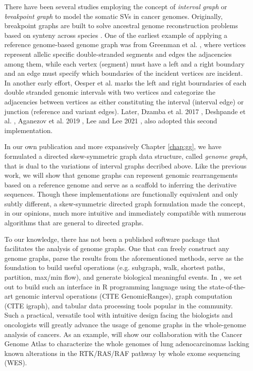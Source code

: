 \documentclass[phd,tocprelim]{cornell}
\begin{document}
There have been several studies employing the concept of \textit{interval graph} or \textit{breakpoint graph} to model the somatic SVs in cancer genomes. Originally, breakpoint graphs are built to solve ancestral genome reconstruction problems based on synteny across species \cite{Alekseyev2009-fw,Avdeyev2016-un}. One of the earliest example of applying a reference genome-based genome graph was from Greenman et al. \cite{Greenman:2012eg}, where vertices represent allelic specific double-stranded segments and edges the adjacencies among them, while each vertex (segment) must have a left and a right boundary and an edge must specify which boundaries of the incident vertices are incident. In another early effort, Oesper et al. \cite{Oesper2012-vw} marks the left and right bourndaries of each double stranded genomic intervals with two vertices and categorize the adjacencies between vertices as either constituting the interval (interval edge) or junction (reference and variant edges). Later, Dzamba et al. 2017 \cite{Dzamba2017-wo}, Deshpande et al. \cite{Deshpande2019-gs}, Aganezov et al. 2019 \cite{Aganezov2019-yh}, Lee and Lee 2021 \cite{Lee2021-rl}, also adopted this second implementation.
 
In our own publication \cite{Hadi2020-um} and more expansively Chapter \ref{chap:gg}, we have formulated a directed skew-symmetric graph data structure, called \textit{genome graph}, that is dual to the variations of interval graphs decribed above. Like the previous work, we will show that genome graphs can represent genomic rearrangements based on a reference genome and serve as a scaffold to inferring the derivative sequences. Though these implementations are functionally equivalent and only subtly different, a skew-symmetric directed graph formulation made the concept, in our opinions, much more intuitive and immediately compatible with numerous algorithms that are general to directed graphs.

To our knowledge, there has not been a published software package that facilitates the analysis of genome graphs. One that can freely construct any genome graphs, parse the results from the aforementioned methods, serve as the foundation to build useful operations (e.g. subgraph, walk, shortest paths, partition, max/min flow), and generate biological meaningful events. In , we set out to build such an interface in R programming language using the state-of-the-art genomic interval operations (CITE GenomicRanges), graph computation (CITE igraph), and tabular data processing tools popular in the community. Such a practical, versatile tool with intuitive design facing the biologists and oncologists will greatly advance the usage of genome graphs in the whole-genome analysis of cancers. As an example,  will show our collaboration with the Cancer Genome Atlas to characterize the whole genomes of lung adenocarcinomas lacking known alterations in the RTK/RAS/RAF pathway by whole exome sequencing (WES).
\end{document}
